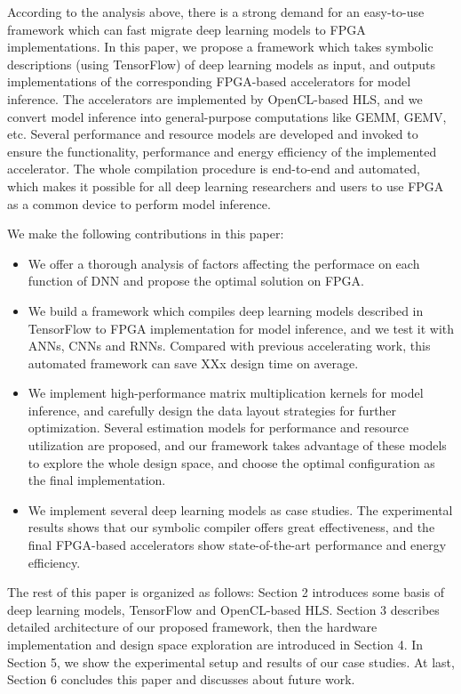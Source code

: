 \documentclass{acm_proc_article-sp-copy}
\begin{document}
According to the analysis above, there is a strong demand for an easy-to-use framework which can fast migrate deep learning models to FPGA implementations. In this paper, we propose a framework which takes symbolic descriptions (using TensorFlow) of deep learning models as input, and outputs implementations of the corresponding FPGA-based accelerators for model inference. The accelerators are implemented by OpenCL-based HLS, and we convert model inference into general-purpose computations like GEMM, GEMV, etc. Several performance and resource models are developed and invoked to ensure the functionality, performance and energy efficiency of the implemented accelerator. The whole compilation procedure is end-to-end and automated, which makes it possible for all deep learning researchers and users to use FPGA as a common device to perform model inference.

We make the following contributions in this paper:
\begin{itemize}
\item We offer a thorough analysis of factors affecting the performace on each function of DNN and propose the optimal solution on FPGA.
\item We build a framework which compiles deep learning models described in TensorFlow to FPGA implementation for model inference, and we test it with ANNs, CNNs and RNNs. Compared with previous accelerating work, this automated framework can save XXx design time on average. 
\item We implement high-performance matrix multiplication kernels for model inference, and carefully design the data layout strategies for further optimization. Several estimation models for performance and resource utilization are proposed, and our framework takes advantage of these models to explore the whole design space, and choose the optimal configuration as the final implementation.
\item We implement several deep learning models as case studies. The experimental results shows that our symbolic compiler offers great effectiveness, and the final FPGA-based accelerators show state-of-the-art performance and energy efficiency.
\end{itemize}

The rest of this paper is organized as follows: Section 2 introduces some basis of deep learning models, TensorFlow and OpenCL-based HLS. Section 3 describes detailed architecture of our proposed framework, then the hardware implementation and design space exploration are introduced in Section 4. In Section 5, we show the experimental setup and results of our case studies. At last, Section 6 concludes this paper and discusses about future work.
\end{document}

